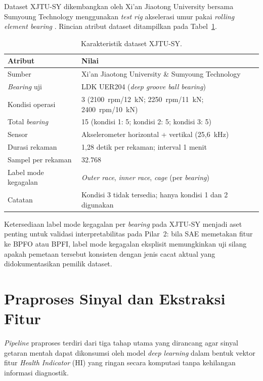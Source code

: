 Dataset XJTU-SY dikembangkan oleh Xi'an Jiaotong University bersama
Sumyoung Technology menggunakan \emph{test rig} akselerasi umur pakai
\emph{rolling element bearing} .
Rincian atribut dataset ditampilkan pada Tabel~\ref{tab:bab4_xjtusy}.

\begin{table}[ht]
\centering
\caption{Karakteristik dataset XJTU-SY.}
\label{tab:bab4_xjtusy}
\small
\begin{tabular}{@{}ll@{}}
\toprule
\textbf{Atribut} & \textbf{Nilai} \\
\midrule
Sumber              & Xi'an Jiaotong University \& Sumyoung Technology \\
\emph{Bearing} uji        & LDK UER204 (\emph{deep groove ball bearing}) \\
Kondisi operasi     & 3 (2100~rpm/12~kN; 2250~rpm/11~kN; 2400~rpm/10~kN) \\
Total \emph{bearing}      & 15 (kondisi 1: 5; kondisi 2: 5; kondisi 3: 5) \\
Sensor              & Akselerometer horizontal + vertikal (25{,}6~kHz) \\
Durasi rekaman      & 1{,}28 detik per rekaman; interval 1 menit \\
Sampel per rekaman  & 32.768 \\
Label mode kegagalan & \emph{Outer race}, \emph{inner race}, \emph{cage} (per \emph{bearing}) \\
Catatan             & Kondisi 3 tidak tersedia; hanya kondisi 1 dan 2 digunakan \\
\bottomrule
\end{tabular}
\end{table}

Ketersediaan label mode kegagalan per \emph{bearing} pada XJTU-SY menjadi aset
penting untuk validasi interpretabilitas pada Pilar~2: bila SAE memetakan
fitur ke BPFO atau BPFI, label mode kegagalan eksplisit memungkinkan
uji silang apakah pemetaan tersebut konsisten dengan jenis cacat aktual
yang didokumentasikan pemilik dataset.

\section{Praproses Sinyal dan Ekstraksi Fitur}
\label{sec:bab4_praproses}

\emph{Pipeline} praproses terdiri dari tiga tahap utama yang dirancang
agar sinyal getaran mentah dapat dikonsumsi oleh model \emph{deep learning}
dalam bentuk vektor fitur \emph{Health Indicator} (HI) yang ringan secara
komputasi tanpa kehilangan informasi diagnostik.

